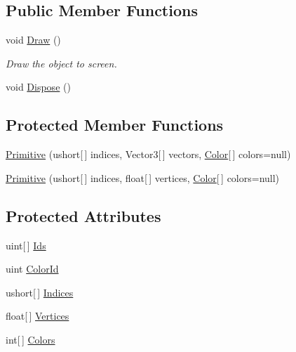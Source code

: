 \subsection*{Public Member Functions}
\begin{DoxyCompactItemize}
\item 
void \hyperlink{class_tri_devs_1_1_tri_engine_1_1_graphics_1_1_primitive_a30aff7615e9c7662f21337db010a42fe}{Draw} ()
\begin{DoxyCompactList}\small\item\em Draw the object to screen. \end{DoxyCompactList}\item 
void \hyperlink{class_tri_devs_1_1_tri_engine_1_1_graphics_1_1_primitive_abfafdcbf2b6911f3aeb8e79038ca89b0}{Dispose} ()
\end{DoxyCompactItemize}
\subsection*{Protected Member Functions}
\begin{DoxyCompactItemize}
\item 
\hyperlink{class_tri_devs_1_1_tri_engine_1_1_graphics_1_1_primitive_acded90f3abacc5d6eed6f37381100030}{Primitive} (ushort\mbox{[}$\,$\mbox{]} indices, Vector3\mbox{[}$\,$\mbox{]} vectors, \hyperlink{struct_tri_devs_1_1_tri_engine_1_1_color}{Color}\mbox{[}$\,$\mbox{]} colors=null)
\item 
\hyperlink{class_tri_devs_1_1_tri_engine_1_1_graphics_1_1_primitive_a2b6e48807b7b751d712e01148304e999}{Primitive} (ushort\mbox{[}$\,$\mbox{]} indices, float\mbox{[}$\,$\mbox{]} vertices, \hyperlink{struct_tri_devs_1_1_tri_engine_1_1_color}{Color}\mbox{[}$\,$\mbox{]} colors=null)
\end{DoxyCompactItemize}
\subsection*{Protected Attributes}
\begin{DoxyCompactItemize}
\item 
uint\mbox{[}$\,$\mbox{]} \hyperlink{class_tri_devs_1_1_tri_engine_1_1_graphics_1_1_primitive_a2cc64a44370d55eb1e4673222373ab9d}{Ids}
\item 
uint \hyperlink{class_tri_devs_1_1_tri_engine_1_1_graphics_1_1_primitive_a9c28bed59141e2166f2ca246d39c2348}{Color\-Id}
\item 
ushort\mbox{[}$\,$\mbox{]} \hyperlink{class_tri_devs_1_1_tri_engine_1_1_graphics_1_1_primitive_a9285dfb37036c35155ba83ade5c310a3}{Indices}
\item 
float\mbox{[}$\,$\mbox{]} \hyperlink{class_tri_devs_1_1_tri_engine_1_1_graphics_1_1_primitive_a700451d3bd4876619fd17304d46d1d27}{Vertices}
\item 
int\mbox{[}$\,$\mbox{]} \hyperlink{class_tri_devs_1_1_tri_engine_1_1_graphics_1_1_primitive_ac2f09f32d071a3b5279951c28b094761}{Colors}
\end{DoxyCompactItemize}
